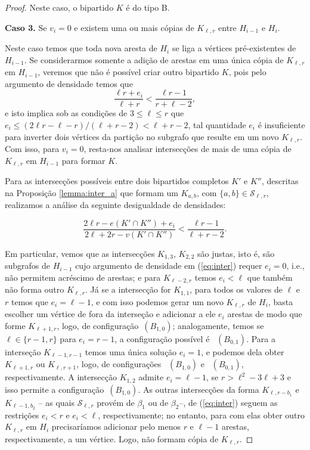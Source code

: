 \documentclass[12pt,a4paper]{book}
\newcommand{\K}{K_{\ell,r}} %
\newcommand{\Slr}{\mathcal{S}_{\ell,r}} %
\begin{document}
\begin{proof}
    Neste caso, o bipartido $K$ é do tipo B.
   
 \medskip \textbf{Caso 3.} 
	  Se $v_i = 0$ e existem uma ou mais cópias de $\K$ entre $H_{i-1}$ e $H_i$. 
	  
	 Neste caso temos que toda nova aresta de $H_i$ se liga a vértices pré-existentes de $H_{i-1}$. 
      Se considerarmos somente a adição de arestas em uma única cópia de $\K$ em $H_{i-1}$, veremos que não é possível criar outro bipartido $K$, pois pelo argumento de densidade temos que
    \[ 
		\frac{\ell r + e_i}{\ell+r} < \frac{\ell r-1}{r+\ell-2},
    \]
	e isto implica sob as condições de $3 \leq \ell \leq r$ que 
	$e_i \leq (2\ell r -\ell-r)/(\ell+r-2) < \ell+r-2$, 
	tal quantidade $e_i$ é insuficiente para inverter dois vértices da partição no subgrafo que resulte em um novo $\K$.
    Com isso, para $v_i=0$, resta-nos analisar intersecções de mais de uma cópia de $\K$ em $H_{i-1}$ para formar $K$.
    
    Para as intersecções possíveis entre dois bipartidos completos $K'$ e $K''$, descritas na Proposição \ref{lemma:inter_a} que formam um $K_{a,b}$, com $\{a,b\} \in \Slr$, realizamos a  análise da seguinte desigualdade de densidades:

    \begin{equation}\label{eq:inter}
        \frac{2\ell r - e(K'\cap K'') + e_i}{2\ell+2r - v(K' \cap K'')} < \frac{\ell r- 1}{\ell+r-2}.
    \end{equation}
	    
     Em particular, vemos que as intersecções $K_{1,3}$, $K_{2,2}$ são  justas, isto é, são subgrafos de $H_{i-1}$ cujo argumento de densidade em (\ref{eq:inter}) requer $e_i=0$, i.e., não permitem acréscimo de arestas;
    e para $K_{\ell-2,r}$ temos $e_i < \ell$ que também não forma outro $\K$.
     Já se a intersecção for $K_{1,1}$, para todos os valores de $\ell$ e $r$ temos que $e_i = \ell-1$, e com isso podemos gerar um novo $\K$ de $H_{i}$, basta escolher um vértice de fora da interseção e adicionar a ele $e_i$ arestas de modo que forme $K_{\ell+1,r}$, logo, de configuração~\hyperref[configB]{$(B_{1,0})$}; analogamente, temos se $\ell \in
        \{r-1, r\}$ para $e_i = r-1$, a configuração possível é
        ~\hyperref[configB]{$(B_{0,1})$}.
    Para a interseção $K_{\ell-1, r-1}$ temos uma única solução $e_i=1$, e podemos dela obter $K_{\ell+1, r}$ ou $K_{\ell,r+1}$, logo, de configurações ~\hyperref[configB]{$(B_{1,0})$}
    e ~\hyperref[configB]{$(B_{0,1})$}, respectivamente.
     A intersecção $K_{1,2}$ admite $e_i = \ell-1$, se $r > \ell^2 - 3\ell+3$ e isso permite a configuração~\hyperref[configB]{$(B_{1,0})$}.
    As outras intersecções da forma $K_{\ell, r-b_1}$ e $K_{\ell-1,b_2}$ -- as quais $\Slr$ provém de $\beta_1$ ou de $\beta_2$--,  de (\ref{eq:inter}) seguem as restrições $e_i < r$ e $e_i < \ell$, respectivamente; no entanto,
	para com elas obter outro $\K$ em $H_i$ precisaríamos adicionar pelo menos
	$r$ e $\ell-1$ arestas, respectivamente, a um vértice. Logo, não formam cópia de $\K$. 
    

\end{proof}
\end{document}

